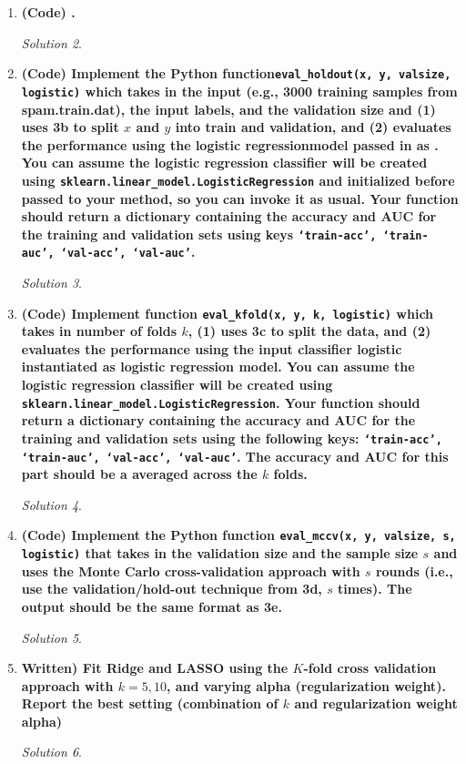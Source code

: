 \documentclass[a4paper,12pt]{article}
\theoremstyle{definition}
\theoremstyle{remark}
\newtheorem*{solution}{Solution}
\begin{document}
\begin{enumerate}
\begin{enumerate}
\begin{solution}
			\end{solution}
			\item {\bf(Code) .}
			\begin{solution}
				
			\end{solution}
			\item {\bf (Code) Implement the Python function\texttt{eval\_holdout(x, y, valsize, logistic)} which takes in the input (e.g., 3000 training samples from spam.train.dat), the input labels, and the validation size and (1) uses 3b to split $x$ and $y$ into train and validation, and (2) evaluates the performance using the logistic regressionmodel passed in as . You can assume the logistic regression classifier will be created using \texttt{sklearn.linear\_model.LogisticRegression} and initialized before passed to your method, so you can invoke it as usual. Your function should return a dictionary containing the accuracy and AUC for the training and validation sets using keys \texttt{‘train-acc’, ‘train-auc’, ‘val-acc’, ‘val-auc’}.}
			\begin{solution}
				
			\end{solution}
			\item {\bf (Code) Implement function \texttt{eval\_kfold(x, y, k, logistic)} which takes in number of folds $k$, (1) uses 3c to split the data, and (2) evaluates the performance using the input classifier logistic instantiated as logistic regression model. You can assume the logistic regression classifier will be created using \texttt{sklearn.linear\_model.LogisticRegression}. Your function should return a dictionary containing the accuracy and AUC for the training and validation sets using the following keys: \texttt{‘train-acc’, ‘train-auc’, ‘val-acc’, ‘val-auc’}. The accuracy and AUC for this part should be a averaged across the $k$ folds.}
			\begin{solution}
				
				
			\end{solution}
			\item {\bf (Code) Implement the Python function \texttt{eval\_mccv(x, y, valsize, s, logistic)} that takes in the validation size and the sample size $s$ and uses the Monte Carlo cross-validation approach with $s$ rounds (i.e., use the validation/hold-out technique from 3d, $s$ times). The output should be the same format as 3e.}
			\begin{solution}
				
			\end{solution}
			\item {\bf Written) Fit Ridge and LASSO using the $K$-fold cross validation approach with $k = 5, 10$, and varying alpha (regularization weight). Report the best setting (combination of $k$ and regularization weight alpha)}
			\begin{solution}
			

\end{solution}
\end{enumerate}
\end{enumerate}
\end{document}
